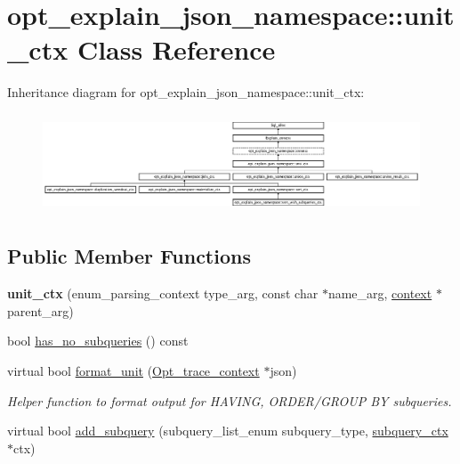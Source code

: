 \hypertarget{classopt__explain__json__namespace_1_1unit__ctx}{}\section{opt\+\_\+explain\+\_\+json\+\_\+namespace\+:\+:unit\+\_\+ctx Class Reference}
\label{classopt__explain__json__namespace_1_1unit__ctx}
Inheritance diagram for opt\+\_\+explain\+\_\+json\+\_\+namespace\+:\+:unit\+\_\+ctx\+:\begin{figure}[H]
\begin{center}
\leavevmode
\includegraphics[height=2.951807cm]{classopt__explain__json__namespace_1_1unit__ctx}
\end{center}
\end{figure}
\subsection*{Public Member Functions}
\begin{DoxyCompactItemize}
\item 
\mbox{\label{classopt__explain__json__namespace_1_1unit__ctx_a5df7618acb9c973f314baa9238e4d383}} 
{\bfseries unit\+\_\+ctx} (enum\+\_\+parsing\+\_\+context type\+\_\+arg, const char $\ast$name\+\_\+arg, \mbox{\hyperlink{classopt__explain__json__namespace_1_1context}{context}} $\ast$parent\+\_\+arg)
\item 
bool \mbox{\hyperlink{classopt__explain__json__namespace_1_1unit__ctx_a9b2badee39a1d53dccdc909b9e5e4d04}{has\+\_\+no\+\_\+subqueries}} () const
\item 
\mbox{\label{classopt__explain__json__namespace_1_1unit__ctx_aa35f66993446f004672b7ed305df8643}} 
virtual bool \mbox{\hyperlink{classopt__explain__json__namespace_1_1unit__ctx_aa35f66993446f004672b7ed305df8643}{format\+\_\+unit}} (\mbox{\hyperlink{classOpt__trace__context}{Opt\+\_\+trace\+\_\+context}} $\ast$json)
\begin{DoxyCompactList}\small\item\em Helper function to format output for H\+A\+V\+I\+NG, O\+R\+D\+E\+R/\+G\+R\+O\+UP BY subqueries. \end{DoxyCompactList}\item 
virtual bool \mbox{\hyperlink{classopt__explain__json__namespace_1_1unit__ctx_a157b828a313f01ec8bd7c4a53644f6b2}{add\+\_\+subquery}} (subquery\+\_\+list\+\_\+enum subquery\+\_\+type, \mbox{\hyperlink{classopt__explain__json__namespace_1_1subquery__ctx}{subquery\+\_\+ctx}} $\ast$ctx)
\end{DoxyCompactItemize}

